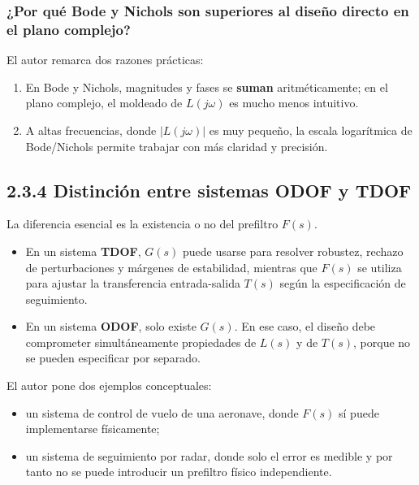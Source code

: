 
\subsubsection{¿Por qué Bode y Nichols son superiores al diseño directo en el plano complejo?}
El autor remarca dos razones prácticas:

\begin{enumerate}
  \item En Bode y Nichols, magnitudes y fases se \textbf{suman} aritméticamente; en el plano complejo, el moldeado de \(L(j\omega)\) es mucho menos intuitivo.
  \item A altas frecuencias, donde \(|L(j\omega)|\) es muy pequeño, la escala logarítmica de Bode/Nichols permite trabajar con más claridad y precisión.
\end{enumerate}

\subsection{2.3.4 Distinción entre sistemas ODOF y TDOF}
La diferencia esencial es la existencia o no del prefiltro \(F(s)\).

\begin{itemize}
  \item En un sistema \textbf{TDOF}, \(G(s)\) puede usarse para resolver robustez, rechazo de perturbaciones y márgenes de estabilidad, mientras que \(F(s)\) se utiliza para ajustar la transferencia entrada-salida \(T(s)\) según la especificación de seguimiento.
  \item En un sistema \textbf{ODOF}, solo existe \(G(s)\). En ese caso, el diseño debe comprometer simultáneamente propiedades de \(L(s)\) y de \(T(s)\), porque no se pueden especificar por separado.
\end{itemize}

El autor pone dos ejemplos conceptuales:

\begin{itemize}
  \item un sistema de control de vuelo de una aeronave, donde \(F(s)\) sí puede implementarse físicamente;
  \item un sistema de seguimiento por radar, donde solo el error es medible y por tanto no se puede introducir un prefiltro físico independiente.
\end{itemize}

